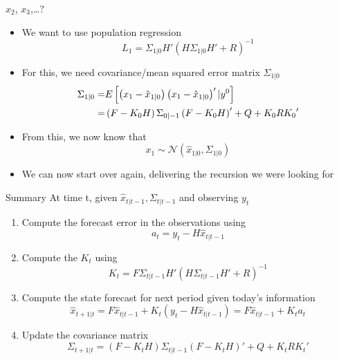 \documentclass[handout,usepdftitle=false,xcolor=dvipsnames,aspectratio=169]{beamer}
\begin{document}
\begin{frame}{$x_2$, $x_3$,\ldots ?}
  \begin{itemize}
    \item We want to use population regression
          \begin{equation*}
            L_1 = \Sigma _{1|0}H'\left(H\Sigma_{1|0}H' + R \right)^{ - 1}
          \end{equation*}
    \item For this, we need covariance/mean squared error matrix $\Sigma_{1|0}$
          \begin{align}
            \Sigma_{1|0}= & E\left[\left( {{x_1} - {{\hat x}_{1|0}}} \right)\left( {{x_1} - {{\hat x}_{1|0}}} \right)'|y^0\right]\notag \\
            =             & \left( {F - {K_0}H} \right){\Sigma _{0|-1}}\left( {F - {K_0}H} \right)' + Q + {K_0}R{K_0}'
          \end{align}

    \item From this, we now know that
          \begin{equation}{x_1} \sim \mathcal{N}\left( {{{\hat x}_{1|0}},{\Sigma _{1|0}}} \right)\end{equation}
    \item We can now start over again, delivering the recursion we were looking for
  \end{itemize}
\end{frame}

\begin{frame}{Summary}
  At time t, given $\hat x_{t|t-1},\Sigma_{t|t-1}$ and observing $y_t$\vspace{0.2cm}
  \begin{enumerate}
    \item Compute the forecast error in the observations using
          \begin{equation}
            a_t= y_t-H\hat x_{t|t-1}
          \end{equation}
    \item Compute the  $K_t$ using
          \begin{equation}\label{eq:filtering_step}
            K_t=F{\Sigma _{t|t-1}}H'{\left( {H{\Sigma _{t|t-1}}H' + R} \right)^{ - 1}}
          \end{equation}
    \item Compute the state forecast for next period given today's information
          \begin{equation}
            \hat x_{t+1|t}=F{{\hat x}_{t|t-1}} + K_t\left( {{y_t} - H{{\hat x}_{t|t-1}}} \right)=F{{\hat x}_{t|t-1}} + K_ta_t
          \end{equation}
    \item Update the covariance matrix
          \begin{equation}
            \Sigma_{t+1|t} = \left( {F - {K_t}H} \right){\Sigma _{t|t-1}}\left( {F - {K_t}H} \right)' + Q + {K_t}R{K_t}' \label{eq:Sigma_tp1givent}
          \end{equation}
  \end{enumerate}
\end{frame}
\end{document}

